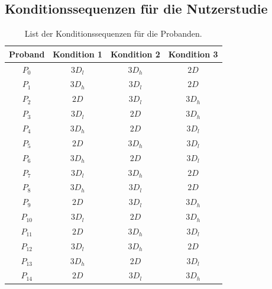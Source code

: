 \begin{appendices}
\chapter{Konditionssequenzen für die Nutzerstudie}
\begin{table}[h]
    \centering
    \caption{List der Konditionssequenzen für die Probanden.}
    \label{appendix:condition_sequences}
    \begin{tabular}{cccc}\toprule
        Proband & Kondition 1 & Kondition 2 & Kondition 3 \\\midrule
        $P_0$ & $3D_l$ & $3D_h$ & $2D$ \\
        $P_1$ & $3D_h$ & $3D_l$ & $2D$ \\
        $P_2$ & $2D$ & $3D_l$ & $3D_h$ \\
        $P_3$ & $3D_l$ & $2D$ & $3D_h$ \\
        $P_4$ & $3D_h$ & $2D$ & $3D_l$ \\
        $P_5$ & $2D$ & $3D_h$ & $3D_l$ \\
        $P_6$ & $3D_h$ & $2D$ & $3D_l$ \\
        $P_7$ & $3D_l$ & $3D_h$ & $2D$ \\
        $P_8$ & $3D_h$ & $3D_l$ & $2D$ \\
        $P_9$ & $2D$ & $3D_l$ & $3D_h$ \\
        $P_{10}$ & $3D_l$ & $2D$ & $3D_h$ \\
        $P_{11}$ & $2D$ & $3D_h$ & $3D_l$ \\
        $P_{12}$ & $3D_l$ & $3D_h$ & $2D$ \\
        $P_{13}$ & $3D_h$ & $2D$ & $3D_l$ \\
        $P_{14}$ & $2D$ & $3D_l$ & $3D_h$ \\\bottomrule        
    \end{tabular}
\end{table}

\end{appendices}
